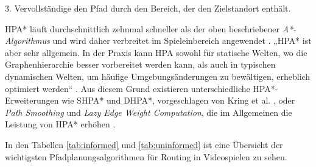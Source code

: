 3. Vervollständige den Pfad durch den Bereich, der den Zielstandort enthält.\\

\begin{sloppypar}
HPA* läuft durchschnittlich zehnmal schneller als der oben beschriebener\textit{ A*-Algorithmus} \cite[S. 1, 26]{Bot04} und wird daher verbreitet im Spieleinbereich angewendet \cite{LSC08}. „HPA* ist aber sehr allgemein. In der Praxis kann HPA sowohl für statische Welten, wo die Graphenhierarchie besser vorbereitet werden kann, als auch in typischen dynamischen Welten, um häufige Umgebungsänderungen zu bewältigen, erheblich optimiert werden“ \cite[S.39]{Kri10}. Aus diesem Grund existieren unterschiedliche HPA*-Erweiterungen wie SHPA* und DHPA*, vorgeschlagen von Kring et al. \cite[S.40ff.]{Kri10}, oder \textit{Path Smoothing} und \textit{Lazy Edge Weight Computation}, die im Allgemeinen die Leistung von HPA* erhöhen \cite{JB07}.
\end{sloppypar}

In den Tabellen \ref{tab:informed} und \ref{tab:uninformed} ist eine Übersicht der wichtigsten Pfadplanungsalgorithmen für Routing in Videospielen zu sehen.



